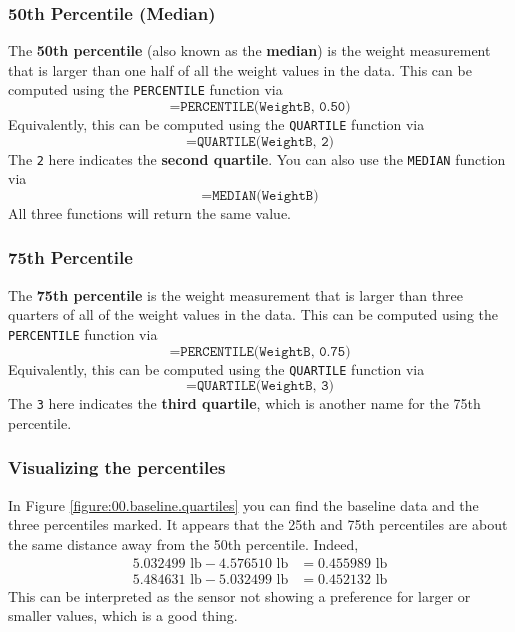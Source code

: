 \subsubsection{50th Percentile (Median)}
The \textbf{50th percentile} (also known as the \textbf{median}) is the weight measurement that is larger than one half of all the weight values in the data. This can be computed using the \texttt{PERCENTILE} function via
\begin{equation}
    \texttt{=PERCENTILE(WeightB, 0.50)}
\end{equation}
Equivalently, this can be computed using the \texttt{QUARTILE} function via
\begin{equation}
    \texttt{=QUARTILE(WeightB, 2)}
\end{equation}
The \texttt{2} here indicates the \textbf{second quartile}. You can also use the \texttt{MEDIAN} function via
\begin{equation}
    \texttt{=MEDIAN(WeightB)}
\end{equation}
All three functions will return the same value.
\subsubsection{75th Percentile}
The \textbf{75th percentile} is the weight measurement that is larger than three quarters of all of the weight values in the data. This can be computed using the \texttt{PERCENTILE} function via
\begin{equation}
    \texttt{=PERCENTILE(WeightB, 0.75)}
\end{equation}
Equivalently, this can be computed using the \texttt{QUARTILE} function via
\begin{equation}
    \texttt{=QUARTILE(WeightB, 3)}
\end{equation}
The \texttt{3} here indicates the \textbf{third quartile}, which is another name for the 75th percentile.
\subsubsection{Visualizing the percentiles}
In Figure \ref{figure:00.baseline.quartiles} you can find the baseline data and the three percentiles marked. It appears that the 25th and 75th percentiles are about the same distance away from the 50th percentile. Indeed,
\begin{align}
    5.032499\text{ lb} - 4.576510\text{ lb} &= 0.455989 \text{ lb} \\
    5.484631\text{ lb} - 5.032499\text{ lb} &= 0.452132 \text{ lb}
\end{align}
This can be interpreted as the sensor not showing a preference for larger or smaller values, which is a good thing.

